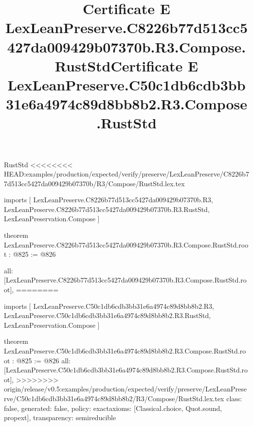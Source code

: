 \begin{lexlean}{RustStd}
<<<<<<<< HEAD:examples/production/expected/verify/preserve/LexLeanPreserve/C8226b77d513cc5427da009429b07370b/R3/Compose/RustStd.lex.tex
\title{Certificate E LexLeanPreserve.C8226b77d513cc5427da009429b07370b.R3.Compose.RustStd}
\begin{coremodule}
imports [
  LexLeanPreserve.C8226b77d513cc5427da009429b07370b.R3,
  LexLeanPreserve.C8226b77d513cc5427da009429b07370b.R3.RustStd,
  LexLeanPreservation.Compose
]

theorem LexLeanPreserve.C8226b77d513cc5427da009429b07370b.R3.Compose.RustStd.root : @825 := @826 {
  all: [LexLeanPreserve.C8226b77d513cc5427da009429b07370b.R3.Compose.RustStd.root],
========
\title{Certificate E LexLeanPreserve.C50c1db6cdb3bb31e6a4974c89d8bb8b2.R3.Compose.RustStd}
\begin{coremodule}
imports [
  LexLeanPreserve.C50c1db6cdb3bb31e6a4974c89d8bb8b2.R3,
  LexLeanPreserve.C50c1db6cdb3bb31e6a4974c89d8bb8b2.R3.RustStd,
  LexLeanPreservation.Compose
]

theorem LexLeanPreserve.C50c1db6cdb3bb31e6a4974c89d8bb8b2.R3.Compose.RustStd.root : @825 := @826 {
  all: [LexLeanPreserve.C50c1db6cdb3bb31e6a4974c89d8bb8b2.R3.Compose.RustStd.root],
>>>>>>>> origin/release/v0.5:examples/production/expected/verify/preserve/LexLeanPreserve/C50c1db6cdb3bb31e6a4974c89d8bb8b2/R3/Compose/RustStd.lex.tex
  class: false,
  generated: false,
  policy: exact{axioms: [Classical.choice, Quot.sound, propext]},
  transparency: semireducible
}


\end{coremodule}}
\end{coremodule}
\end{lexlean}
